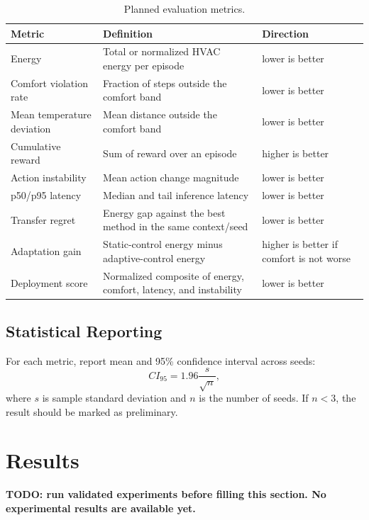 \documentclass[11pt,a4paper]{article}
\begin{document}
\begin{table}[ht]
\centering
\caption{Planned evaluation metrics.}
\label{tab:metrics}
\begin{tabularx}{\textwidth}{lYY}
\toprule
Metric & Definition & Direction \\
\midrule
Energy & Total or normalized HVAC energy per episode & lower is better \\
Comfort violation rate & Fraction of steps outside the comfort band & lower is better \\
Mean temperature deviation & Mean distance outside the comfort band & lower is better \\
Cumulative reward & Sum of reward over an episode & higher is better \\
Action instability & Mean action change magnitude & lower is better \\
p50/p95 latency & Median and tail inference latency & lower is better \\
Transfer regret & Energy gap against the best method in the same context/seed & lower is better \\
Adaptation gain & Static-control energy minus adaptive-control energy & higher is better if comfort is not worse \\
Deployment score & Normalized composite of energy, comfort, latency, and instability & lower is better \\
\bottomrule
\end{tabularx}
\end{table}

\subsection{Statistical Reporting}

For each metric, report mean and 95\% confidence interval across seeds:
\begin{equation}
CI_{95} = 1.96 \frac{s}{\sqrt{n}},
\end{equation}
where $s$ is sample standard deviation and $n$ is the number of seeds. If $n<3$, the result should be marked as preliminary.

\section{Results}
\label{sec:results}

\textbf{TODO: run validated experiments before filling this section. No experimental results are available yet.}
\end{document}
